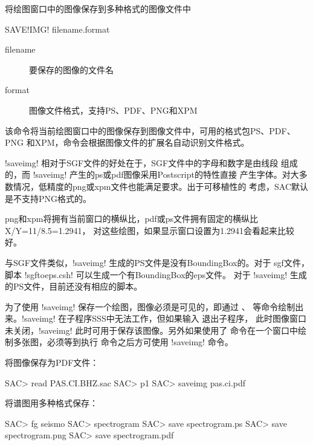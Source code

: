 \label{cmd:saveimg}

将绘图窗口中的图像保存到多种格式的图像文件中

\begin{SACSTX}
SAVE!IMG! filename.format
\end{SACSTX}

\begin{description}
\item [filename] 要保存的图像的文件名
\item [format] 图像文件格式，支持PS、PDF、PNG和XPM
\end{description}

该命令将当前绘图窗口中的图像保存到图像文件中，可用的格式包PS、PDF、PNG
和XPM，命令会根据图像文件的扩展名自动识别文件格式。

!saveimg! 相对于SGF文件的好处在于，SGF文件中的字母和数字是由线段
组成的，而 !saveimg! 产生的ps或pdf图像采用Postscript的特性直接
产生字体。对大多数情况，低精度的png或xpm文件也能满足要求。出于可移植性的
考虑，SAC默认是不支持PNG格式的。

png和xpm将拥有当前窗口的横纵比，pdf或ps文件拥有固定的横纵比X/Y=11/8.5=1.2941，
对这些绘图，如果显示窗口设置为1.2941会看起来比较好。

与SGF文件类似，!saveimg! 生成的PS文件是没有BoundingBox的。对于
sgf文件，脚本 !sgftoeps.csh! 可以生成一个有BoundingBox的eps文件。
对于 !saveimg! 生成的PS文件，目前还没有相应的脚本。

为了使用 !saveimg! 保存一个绘图，图像必须是可见的，即通过
、 等命令绘制出来。!saveimg!
在子程序SSS中无法工作，但如果输入  退出子程序，
此时图像窗口未关闭，!saveimg! 此时可用于保存该图像。另外如果使用了
 命令在一个窗口中绘制多张图，必须等到执行
 命令之后方可使用 !saveimg! 命令。

将图像保存为PDF文件：
\begin{SACCode}
SAC> read PAS.CI.BHZ.sac
SAC> p1
SAC> saveimg pas.ci.pdf
\end{SACCode}

将谱图用多种格式保存：
\begin{SACCode}
SAC> fg seismo
SAC> spectrogram
SAC> save spectrogram.ps
SAC> save spectrogram.png
SAC> save spectrogram.pdf
\end{SACCode}
